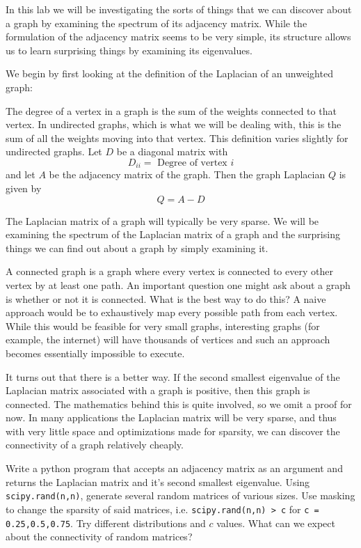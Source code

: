 \documentclass{newsiambook}
\begin{document}
In this lab we will be investigating the sorts of things that we can discover about a graph by examining the spectrum of its  adjacency matrix.  While the formulation of the adjacency matrix seems to be very simple, its structure allows us to learn surprising things by examining its eigenvalues.  

We begin by first looking at the definition of the Laplacian of an unweighted graph:

\begin{definition}  The degree of a vertex in a graph is the sum of the weights connected to that vertex.  In undirected graphs, which is what we will be dealing with, this is the sum of all the weights moving into that vertex.  This definition varies slightly for undirected graphs. Let $D$ be a diagonal matrix with
\[
D_{ii} = \mbox{ Degree of vertex $i$}
\]
and let $A$ be the adjacency matrix of the graph.  Then the graph Laplacian $Q$ is given by
\[
Q = A - D
\]
\end{definition}

The Laplacian matrix of a graph will typically be very sparse.  We will be examining the spectrum of the Laplacian matrix of a graph and the surprising things we can find out about a graph by simply examining it.    

A connected graph is a graph where every vertex is connected to every other vertex by at least one path.  An important question one might ask about a graph is whether or not it is connected.  What is the best way to do this?  A naive approach would be to exhaustively map every possible path from each vertex.  While this would be feasible for very small graphs, interesting graphs (for example, the internet) will have thousands of vertices and such an approach becomes essentially impossible to execute.

It turns out that there is a better way.  If the second smallest eigenvalue of the Laplacian matrix associated with a graph is positive, then this graph is connected.  The mathematics behind this is quite involved, so we omit a proof for now.  In many applications the Laplacian matrix will be very sparse, and thus with very little space and optimizations made for sparsity, we can discover the connectivity of a graph relatively cheaply.

\begin{problem}Write a python program that accepts an adjacency matrix as an argument and returns the Laplacian matrix and it's second smallest eigenvalue.  Using {\tt scipy.rand(n,n)}, generate several random matrices of various sizes.  Use masking to change the sparsity of said matrices, i.e. {\tt scipy.rand(n,n) > c} for {\tt c = 0.25,0.5,0.75}.  Try different distributions and $c$ values.  What can we expect about the connectivity of random matrices?
\end{problem}
\end{document}
